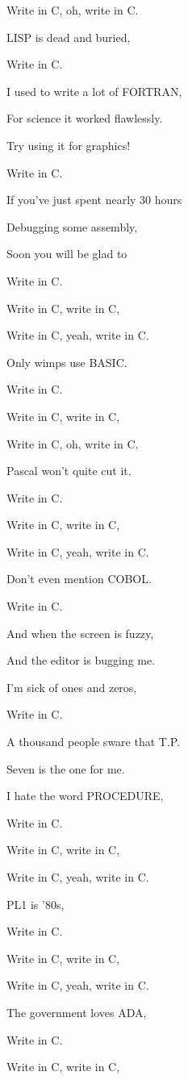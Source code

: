 Write in C, oh, write in C.

LISP is dead and buried,

Write in C.\bigskip

I used to write a lot of FORTRAN,

For science it worked flawlessly.

Try using it for graphics!

Write in C.\bigskip

If you've just spent nearly 30 hours

Debugging some assembly,

Soon you will be glad to

Write in C.\bigskip

Write in C, write in C,

Write in C, yeah, write in C.

Only wimps use BASIC.

Write in C. \bigskip

Write in C, write in C,

Write in C, oh, write in C.

Pascal won't quite cut it.

Write in C.\bigskip

Write in C, write in C,

Write in C, yeah, write in C.

Don't even mention COBOL.

Write in C.\bigskip

And when the screen is fuzzy,

And the editor is bugging me.

I'm sick of ones and zeros,

Write in C.\bigskip

A thousand people sware that T.P.

Seven is the one for me.

I hate the word PROCEDURE,

Write in C.\bigskip

Write in C, write in C,

Write in C, yeah, write in C.

PL1 is '80s,

Write in C.\bigskip

Write in C, write in C,

Write in C, yeah, write in C.

The government loves ADA,

Write in C.\bigskip

Write in C, write in C,

